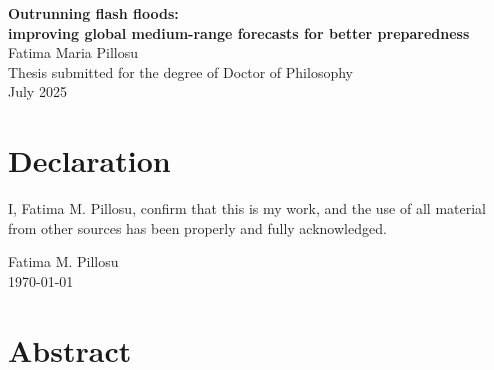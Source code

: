 \documentclass{thesis} %
\begin{document}
\begin{titlepage}
\begin{center}
        {\huge\bfseries Outrunning flash floods:\\
        improving global medium-range forecasts for better preparedness}\\[1cm]
        
        {\Large Fatima Maria Pillosu}\\[5.5cm]
        
        {\Large  Thesis submitted for the degree of Doctor of Philosophy}\\[0.2cm]
        {\Large  July 2025}
    \end{center}
\end{titlepage}


\thispagestyle{empty} %

\newpage
\null
\newpage
\setcounter{page}{1} %

\chapter*{\Large Declaration}

I, Fatima M. Pillosu, confirm that this is my work, and the use of all material from other sources has been properly and fully acknowledged. \\[1cm]

\begin{flushright}
Fatima M. Pillosu \\
\today
\end{flushright}

\newpage
\null
\newpage
\setcounter{page}{3} %

\chapter*{\Large Abstract}
\end{document}
